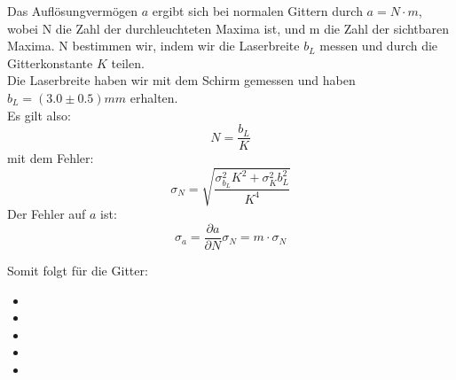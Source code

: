 Das Aufl\"osungverm\"ogen $a$ ergibt sich bei normalen Gittern durch $a=N\cdot m$, wobei N die Zahl der durchleuchteten Maxima ist, und m die Zahl der sichtbaren Maxima. N bestimmen wir, indem wir die Laserbreite $b_L$ messen und durch die Gitterkonstante $K$ teilen.\\
Die Laserbreite haben wir mit dem Schirm gemessen und haben $b_L = (3.0 \pm 0.5) mm$ erhalten.\\
Es gilt also: $$N = \frac{b_L}{K}$$
mit dem Fehler: $$\sigma_N = \sqrt{\frac{\sigma_{b_L}^2K^2 + \sigma_K^2b_L^2}{K^4}}$$
Der Fehler auf $a$ ist: $$\sigma_a = \frac{\partial a}{\partial N}\sigma_N = m\cdot \sigma_N$$

Somit folgt f\"ur die Gitter:

\begin{itemize}
\item
\item
\item
\item
\item
\end{itemize}






























